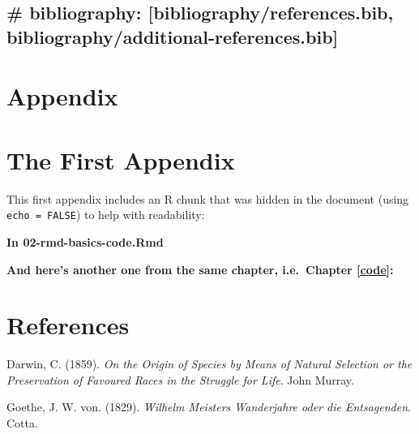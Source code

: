 \documentclass[a4paper, nobind]{templates/ociamthesis}
\newlength{\cslhangindent}
\newenvironment{CSLReferences}[2] %
 {%
  \setlength{\parindent}{0pt}
  \ifodd #1
  \let\oldpar\par
  \def\par{\hangindent=\cslhangindent\oldpar}
  \fi
  \setlength{\parskip}{1mm}
  \setlength{\baselineskip}{6mm}
 }%
 {}
\begin{document}
\hypertarget{bibliography-bibliographyreferences.bib-bibliographyadditional-references.bib}{%
\section{\# bibliography: {[}bibliography/references.bib, bibliography/additional-references.bib{]}}\label{bibliography-bibliographyreferences.bib-bibliographyadditional-references.bib}}





\hypertarget{appendix}{%
\chapter*{Appendix}\label{appendix}}

\startappendices

\hypertarget{the-first-appendix}{%
\chapter{The First Appendix}\label{the-first-appendix}}

This first appendix includes an R chunk that was hidden in the document (using \texttt{echo\ =\ FALSE}) to help with readability:

\textbf{In 02-rmd-basics-code.Rmd}

\textbf{And here's another one from the same chapter, i.e.~Chapter \ref{code}:}

\hypertarget{references}{%
\chapter*{References}\label{references}}


\hypertarget{refs}{}
\begin{CSLReferences}{1}{0}
\leavevmode{}%
Darwin, C. (1859). \emph{{On the Origin of Species by Means of Natural Selection or the Preservation of Favoured Races in the Struggle for Life}}. John Murray.

\leavevmode{}%
Goethe, J. W. von. (1829). \emph{Wilhelm {Meisters} {Wanderjahre} oder die {Entsagenden}}. Cotta.

\end{CSLReferences}

\end{document}

